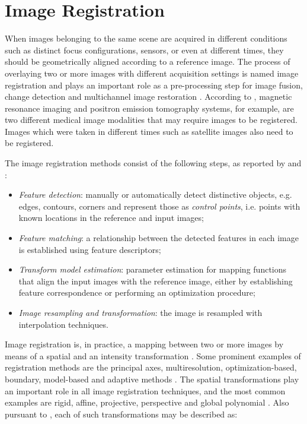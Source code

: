 \section{Image Registration}

When images belonging to the same scene are acquired in different conditions such as distinct focus configurations, sensors, or even at different times, they should be geometrically aligned according to a reference image. The process of overlaying two or more images with different acquisition settings is named image registration and plays an important role as a pre-processing step for image fusion, change detection and multichannel image restoration \cite{zitova2003image}. According to , magnetic resonance imaging and positron emission tomography systems, for example, are two different medical image modalities that may require images to be registered. Images which were taken in different times such as satellite images also need to be registered.

The image registration methods consist of the following steps, as reported by  and :

\begin{itemize}
    \item \emph{Feature detection}: manually or automatically detect distinctive objects, e.g. edges, contours, corners and represent those as \emph{control points}, i.e. points with known locations in the reference and input images;

    \item \emph{Feature matching}: a relationship between the detected features in each image is established using feature descriptors;

    \item \emph{Transform model estimation}: parameter estimation for mapping functions that align the input images with the reference image, either by establishing feature correspondence or performing an optimization procedure;

    \item \emph{Image resampling and transformation}: the image is resampled with interpolation techniques.

\end{itemize}

Image registration is, in practice, a mapping between two or more images by means of a spatial and an intensity transformation \cite{brown1992survey}. Some prominent examples of registration methods are the principal axes, multiresolution, optimization-based, boundary, model-based and adaptive methods  \cite{goshtasby2012image}. The spatial transformations play an important role in all image registration techniques, and the most common examples are rigid, affine, projective, perspective and global polynomial \cite{brown1992survey}. Also pursuant to , each of such transformations may be described as:

